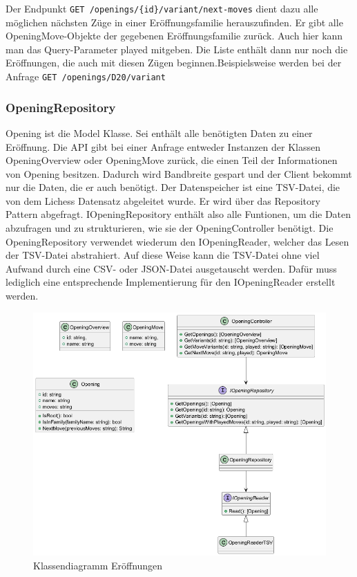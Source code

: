 Der Endpunkt \lstinline|GET /openings/{id}/variant/next-moves| dient dazu alle möglichen nächsten Züge in einer Eröffnungsfamilie herauszufinden. Er gibt alle OpeningMove-Objekte der gegebenen Eröffnungsfamilie zurück. Auch hier kann man das Query-Parameter played mitgeben. Die Liste enthält dann nur noch die Eröffnungen, die auch mit diesen Zügen beginnen.Beispielsweise werden bei der Anfrage \lstinline|GET /openings/D20/variant| 


\subsubsection{OpeningRepository}
Opening ist die Model Klasse. Sei enthält alle benötigten Daten zu einer Eröffnung. Die API gibt bei einer Anfrage entweder Instanzen der Klassen OpeningOverview oder OpeningMove zurück, die einen Teil der Informationen von Opening besitzen. Dadurch wird Bandbreite gespart und der Client bekommt nur die Daten, die er auch benötigt. Der Datenspeicher ist eine TSV-Datei, die von dem Lichess Datensatz abgeleitet wurde. %
Er wird über das Repository Pattern abgefragt. IOpeningRepository enthält also alle Funtionen, um die Daten abzufragen und zu strukturieren, wie sie der OpeningController benötigt. Die OpeningRepository verwendet wiederum den IOpeningReader, welcher das Lesen der TSV-Datei abstrahiert. Auf diese Weise kann die TSV-Datei ohne viel Aufwand durch eine CSV- oder JSON-Datei ausgetauscht werden. Dafür muss lediglich eine entsprechende Implementierung für den IOpeningReader erstellt werden.

\begin{figure}[h]
  \includegraphics[width=\linewidth]{images/diagrams/opening.png}
  \caption{Klassendiagramm Eröffnungen}
  \label{fig:cd_opening}
\end{figure}

